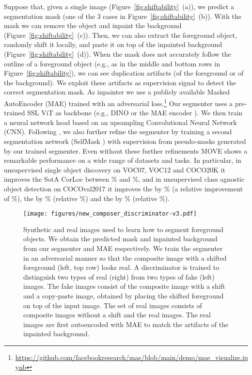 \documentclass{article}
\newcommand\methodname{MOVE\xspace}
\begin{document}
Suppose that, given a single image (Figure~\ref{fig:shiftability}~(a)), we predict a segmentation mask (one of the 3 cases in Figure~\ref{fig:shiftability}~(b)). With the mask we can remove the object and inpaint the background (Figure~\ref{fig:shiftability}~(c)). Then, we can also extract the foreground object, randomly shift it locally, and paste it on top of the inpainted background (Figure~\ref{fig:shiftability}~(d)). 
When the mask does not accurately follow the outline of a foreground object (e.g., as in the middle and bottom rows in Figure~\ref{fig:shiftability}), we can see duplication artifacts (of the foreground or of the background). We exploit these artifacts as supervision signal to detect the correct segmentation mask.
As inpainter we use a publicly available Masked AutoEncoder (MAE) \cite{he2021masked} trained with an adversarial loss.\footnote{\url{https://github.com/facebookresearch/mae/blob/main/demo/mae_visualize.ipynb}}
Our segmenter uses a pre-trained SSL ViT as backbone (e.g., DINO \cite{caron2021emerging} or the MAE encoder \cite{he2021masked}). We then train a neural network head based on an upsampling Convolutional Neural Network (CNN).
Following \cite{Shin2022selfmask}, we also further refine the segmenter by training a second segmentation network (SelfMask \cite{Shin2022selfmask}) with supervision from pseudo-masks generated by our trained segmenter.
Even without these further refinements \methodname shows a remarkable performance on a wide range of datasets and tasks.
In particular, in unsupervised single object discovery on VOC07, VOC12 and COCO20K it improves the SotA CorLoc between \% and \%, and in unsupervised class agnostic object detection on COCOval2017 it improves the  by \% (a relative improvement of \%), the  by \% (relative \%) and the  by \% (relative \%).




\begin{figure}[t]
  \centering
\texttt{[image: figures/new\_composer\_discriminator-v3.pdf]}
\caption{Synthetic and real images used to learn how to segment foreground objects. 
We obtain the predicted mask and inpainted background from our segmenter and MAE respectively. We train the segmenter in an adversarial manner so that the composite image with a shifted foreground (left, top row) looks real. A discriminator is trained to distinguish two types of real (right) from two types of fake (left) images. The fake images consist of the composite image with a shift and a copy-paste image, obtained by placing the shifted foreground on top of the input image. The set of real images consists of composite images without a shift and the real images. The real images are first autoencoded with MAE to match the artifacts of the inpainted background.
\label{fig:composer}}

\end{figure}
\end{document}
